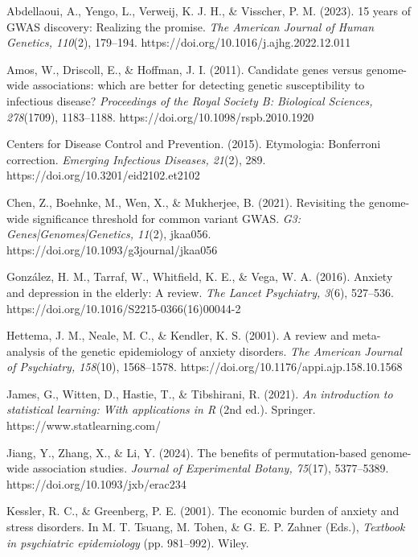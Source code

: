 \documentclass[12pt]{article}
\begin{document}
\begin{thebibliography}{99}
Abdellaoui, A., Yengo, L., Verweij, K. J. H., \& Visscher, P. M. (2023). 15 years of GWAS discovery: Realizing the promise. \textit{The American Journal of Human Genetics, 110}(2), 179–194. https://doi.org/10.1016/j.ajhg.2022.12.011

Amos, W., Driscoll, E., \& Hoffman, J. I. (2011). Candidate genes versus genome-wide associations: which are better for detecting genetic susceptibility to infectious disease? \textit{Proceedings of the Royal Society B: Biological Sciences, 278}(1709), 1183–1188. https://doi.org/10.1098/rspb.2010.1920

Centers for Disease Control and Prevention. (2015). Etymologia: Bonferroni correction. \textit{Emerging Infectious Diseases, 21}(2), 289. https://doi.org/10.3201/eid2102.et2102

Chen, Z., Boehnke, M., Wen, X., \& Mukherjee, B. (2021). Revisiting the genome-wide significance threshold for common variant GWAS. \textit{G3: Genes|Genomes|Genetics, 11}(2), jkaa056. https://doi.org/10.1093/g3journal/jkaa056

González, H. M., Tarraf, W., Whitfield, K. E., \& Vega, W. A. (2016). Anxiety and depression in the elderly: A review. \textit{The Lancet Psychiatry, 3}(6), 527–536. https://doi.org/10.1016/S2215-0366(16)00044-2

Hettema, J. M., Neale, M. C., \& Kendler, K. S. (2001). A review and meta-analysis of the genetic epidemiology of anxiety disorders. \textit{The American Journal of Psychiatry, 158}(10), 1568–1578. https://doi.org/10.1176/appi.ajp.158.10.1568

James, G., Witten, D., Hastie, T., \& Tibshirani, R. (2021). \textit{An introduction to statistical learning: With applications in R} (2nd ed.). Springer. https://www.statlearning.com/

Jiang, Y., Zhang, X., \& Li, Y. (2024). The benefits of permutation-based genome-wide association studies. \textit{Journal of Experimental Botany, 75}(17), 5377–5389. https://doi.org/10.1093/jxb/erac234

Kessler, R. C., \& Greenberg, P. E. (2001). The economic burden of anxiety and stress disorders. In M. T. Tsuang, M. Tohen, \& G. E. P. Zahner (Eds.), \textit{Textbook in psychiatric epidemiology} (pp. 981–992). Wiley.


\end{thebibliography}
\end{document}
